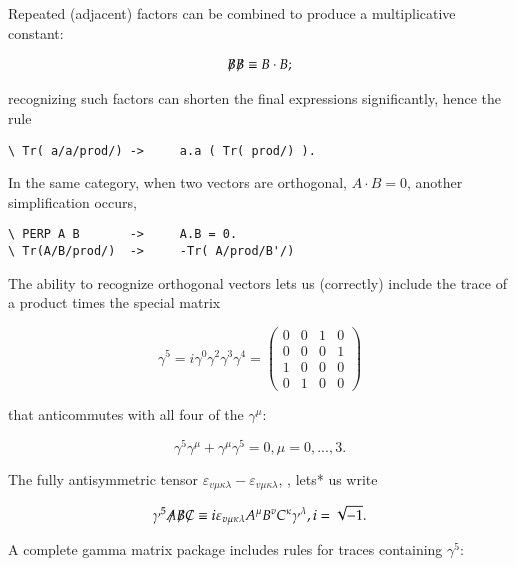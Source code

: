 Repeated (adjacent) factors can be combined to produce a multiplicative constant:

\begin{align}\label{eq:11_08}
    \tr{B}\tr{B} \equiv B \cdot B ;
\end{align}

recognizing such factors can shorten the final expressions significantly, hence the rule

\begin{verbatim}
\ Tr( a/a/prod/) ->     a.a ( Tr( prod/) ).
\end{verbatim}

In the same category, when two vectors are orthogonal, $A\cdot B = 0$, another simplification occurs,

\begin{verbatim}
\ PERP A B       ->     A.B = 0.
\ Tr(A/B/prod/)  ->     -Tr( A/prod/B'/)
\end{verbatim}

The ability to recognize orthogonal vectors lets us (correctly)
include the trace of a product times the special matrix

\begin{equation}\label{eq:11_09}
    \gamma^{5} = i \gamma^{0} \gamma^{2} \gamma^{3} \gamma^{4} =
    \begin{pmatrix}
        0 &  0 &  1 &  0 \\
        0 &  0 &  0 &  1 \\
        1 &  0 &  0 &  0 \\
        0 &  1 &  0 &  0 
    \end{pmatrix}
\end{equation}

that anticommutes with all four of the $\gamma^{\mu}$:

\begin{equation}\label{eq:11_09}
    \gamma^{5}\gamma^{\mu} + \gamma^{\mu}\gamma^{5} = 0, \mu = 0,...,3 . \nonumber
\end{equation}

The fully antisymmetric tensor $\varepsilon_{v\mu\kappa\lambda} -\varepsilon_{v\mu\kappa\lambda}$, \etc, lets* us write

\begin{equation}\label{eq:11_10}
\gamma^{5}\tr{A}\tr{B}\tr{C} \equiv i \varepsilon_{v\mu\kappa\lambda} A^{\mu}B^{v}C^{\kappa}\gamma^{\lambda}, i = \sqrt{-1}  .
\end{equation}

A complete gamma matrix package includes rules for traces containing $\gamma^{5}$:

